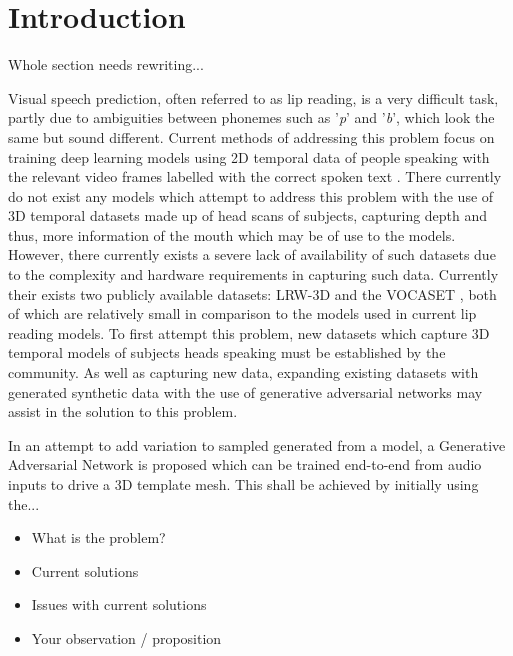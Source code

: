 \chapter{Introduction}

Whole section needs rewriting...

Visual speech prediction, often referred to as lip reading, is a very difficult task, partly due to ambiguities between phonemes such as '\textit{p}' and '\textit{b}', which look the same but sound different.
Current methods of addressing this problem focus on training deep learning models using 2D temporal data of people speaking with the relevant video frames labelled with the correct spoken text \cite{Chung2016, Assael2016, Chung2017, Shillingford2018}.
There currently do not exist any models which attempt to address this problem with the use of 3D temporal datasets made up of head scans of subjects, capturing depth and thus, more information of the mouth which may be of use to the models.
However, there currently exists a severe lack of availability of such datasets due to the complexity and hardware requirements in capturing such data.
Currently their exists two publicly available datasets: LRW-3D \cite{Tzirakis2019} and the VOCASET \cite{Cudeiro2019}, both of which are relatively small in comparison to the models used in current lip reading models.
To first attempt this problem, new datasets which capture 3D temporal models of subjects heads speaking must be established by the community.
As well as capturing new data, expanding existing datasets with generated synthetic data with the use of generative adversarial networks may assist in the solution to this problem.

In an attempt to add variation to sampled generated from a model, a Generative Adversarial Network is proposed which can be trained end-to-end from audio inputs to drive a 3D template mesh.
This shall be achieved by initially using the...

\begin{itemize}

    \item What is the problem?
    \item Current solutions
    \item Issues with current solutions
    \item Your observation / proposition

\end{itemize}